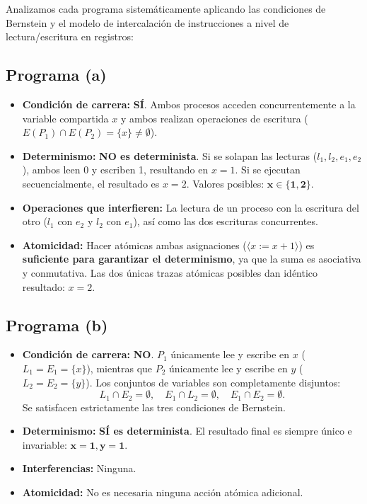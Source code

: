 \begin{solucion}
Analizamos cada programa sistemáticamente aplicando las condiciones de Bernstein y el modelo de intercalación de instrucciones a nivel de lectura/escritura en registros:

\subsection*{Programa (a)}
\begin{itemize}[leftmargin=*]
    \item \textbf{Condición de carrera:} \textbf{SÍ}. Ambos procesos acceden concurrentemente a la variable compartida $x$ y ambos realizan operaciones de escritura ($E(P_1) \cap E(P_2) = \{x\} \neq \emptyset$).
    \item \textbf{Determinismo:} \textbf{NO es determinista}. Si se solapan las lecturas ($l_1, l_2, e_1, e_2$), ambos leen 0 y escriben 1, resultando en $x = 1$. Si se ejecutan secuencialmente, el resultado es $x = 2$. Valores posibles: $\mathbf{x \in \{1, 2\}}$.
    \item \textbf{Operaciones que interfieren:} La lectura de un proceso con la escritura del otro ($l_1$ con $e_2$ y $l_2$ con $e_1$), así como las dos escrituras concurrentes.
    \item \textbf{Atomicidad:} Hacer atómicas ambas asignaciones ($\langle x := x + 1 \rangle$) es \textbf{suficiente para garantizar el determinismo}, ya que la suma es asociativa y conmutativa. Las dos únicas trazas atómicas posibles dan idéntico resultado: $x = 2$.
\end{itemize}

\subsection*{Programa (b)}
\begin{itemize}[leftmargin=*]
    \item \textbf{Condición de carrera:} \textbf{NO}. $P_1$ únicamente lee y escribe en $x$ ($L_1 = E_1 = \{x\}$), mientras que $P_2$ únicamente lee y escribe en $y$ ($L_2 = E_2 = \{y\}$). Los conjuntos de variables son completamente disjuntos:
    \[
    L_1 \cap E_2 = \emptyset, \quad E_1 \cap L_2 = \emptyset, \quad E_1 \cap E_2 = \emptyset.
    \]
    Se satisfacen estrictamente las tres condiciones de Bernstein.
    \item \textbf{Determinismo:} \textbf{SÍ es determinista}. El resultado final es siempre único e invariable: $\mathbf{x = 1, y = 1}$.
    \item \textbf{Interferencias:} Ninguna.
    \item \textbf{Atomicidad:} No es necesaria ninguna acción atómica adicional.
\end{itemize}


\end{solucion}
